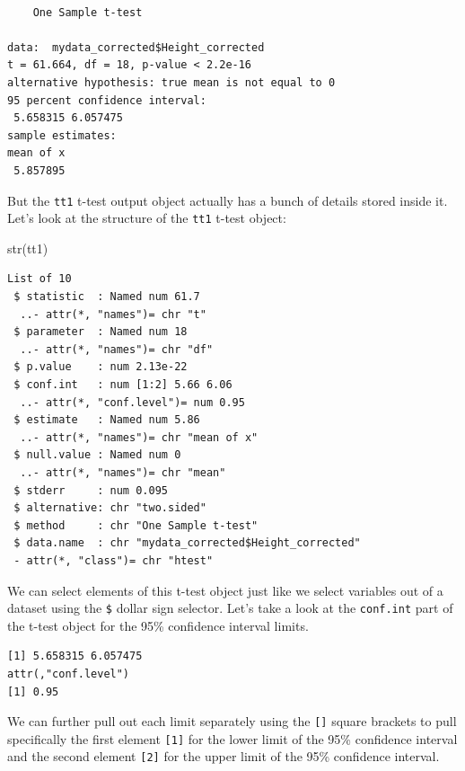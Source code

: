 \documentclass[
  letterpaper,
  DIV=11,
  numbers=noendperiod]{scrartcl}
\newenvironment{Shaded}{\begin{snugshade}}{\end{snugshade}}
\newcommand{\FunctionTok}[1]{\textcolor[rgb]{0.28,0.35,0.67}{#1}}
\newcommand{\NormalTok}[1]{\textcolor[rgb]{0.00,0.23,0.31}{#1}}
\newcommand{\SpecialCharTok}[1]{\textcolor[rgb]{0.37,0.37,0.37}{#1}}
\begin{document}
\begin{verbatim}

    One Sample t-test

data:  mydata_corrected$Height_corrected
t = 61.664, df = 18, p-value < 2.2e-16
alternative hypothesis: true mean is not equal to 0
95 percent confidence interval:
 5.658315 6.057475
sample estimates:
mean of x 
 5.857895 
\end{verbatim}

But the \texttt{tt1} t-test output object actually has a bunch of
details stored inside it. Let's look at the structure of the
\texttt{tt1} t-test object:

\begin{Shaded}
\begin{Highlighting}[]
\FunctionTok{str}\NormalTok{(tt1)}
\end{Highlighting}
\end{Shaded}

\begin{verbatim}
List of 10
 $ statistic  : Named num 61.7
  ..- attr(*, "names")= chr "t"
 $ parameter  : Named num 18
  ..- attr(*, "names")= chr "df"
 $ p.value    : num 2.13e-22
 $ conf.int   : num [1:2] 5.66 6.06
  ..- attr(*, "conf.level")= num 0.95
 $ estimate   : Named num 5.86
  ..- attr(*, "names")= chr "mean of x"
 $ null.value : Named num 0
  ..- attr(*, "names")= chr "mean"
 $ stderr     : num 0.095
 $ alternative: chr "two.sided"
 $ method     : chr "One Sample t-test"
 $ data.name  : chr "mydata_corrected$Height_corrected"
 - attr(*, "class")= chr "htest"
\end{verbatim}

We can select elements of this t-test object just like we select
variables out of a dataset using the \texttt{\$} dollar sign selector.
Let's take a look at the \texttt{conf.int} part of the t-test object for
the 95\% confidence interval limits.

\begin{Shaded}
\end{Shaded}

\begin{verbatim}
[1] 5.658315 6.057475
attr(,"conf.level")
[1] 0.95
\end{verbatim}

We can further pull out each limit separately using the \texttt{{[}{]}}
square brackets to pull specifically the first element \texttt{{[}1{]}}
for the lower limit of the 95\% confidence interval and the second
element \texttt{{[}2{]}} for the upper limit of the 95\% confidence
interval.
\end{document}

